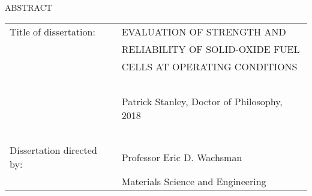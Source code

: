 
\hbox{\ }

\renewcommand{\baselinestretch}{1}
\small \normalsize

\begin{center}
\large{{ABSTRACT}}

\vspace{3em}

\end{center}
\hspace{-.15in}
\begin{tabular}{ll}
Title of dissertation:    & {\large  EVALUATION OF STRENGTH AND  }\\
&				      {\large  RELIABILITY OF SOLID-OXIDE FUEL } \\
&				      {\large  CELLS AT OPERATING CONDITIONS} \\
\ \\
&                          {\large  Patrick Stanley, Doctor of Philosophy, 2018} \\
\ \\
Dissertation directed by: & {\large  Professor Eric D. Wachsman} \\
&  				{\large	 Materials Science and Engineering } \\
\end{tabular}

\vspace{3em}

\renewcommand{\baselinestretch}{2}
\large \normalsize

\lipsum[1-4] %

